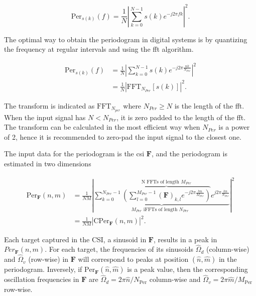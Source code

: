     \begin{equation}
        \text{Per}_{s(k)}(f) = \frac{1}{N}\left| \sum_{k=0}^{N-1} s(k)e^{-j2\pi fk}\right|^2.
    \end{equation}

    The optimal way to obtain the periodogram in digital systems is by quantizing the frequency at regular intervals and using the \gls{fft} algorithm.

    \begin{align}
        \text{Per}_{s(k)}(f) &= \frac{1}{N}\left| \sum_{k=0}^{N-1} s(k)e^{-j2\pi \frac{nk}{N_{Per}}}\right|^2 \\
        &= \frac{1}{N}\left| \text{FFT}_{N_{Per}}[s(k)]\right|^2.
    \end{align}
    
    
    The transform is indicated as $\text{FFT}_{N_{per}}$ where $N_{Per} \geq N$ is the length of the \gls{fft}. When the input signal has $N < N_{Per}$, it is zero padded to the length of the \gls{fft}.
    The transform can be calculated in the most efficient way when $N_{Per}$ is a power of 2, hence it is recommended to zero-pad the input signal to the closest one.

    The input data for the periodogram is the \gls{csi} $\mathbf F$, and the periodogram is estimated in two dimensions

    \begin{equation}
    	\label{eq:periodogram_full}
    	\begin{aligned}
    		\text{Per}_{\mathbf F}(n,m) &= \frac{1}{NM} \left| \underbrace{ \sum_{k=0}^{N_{Per}-1}  \overbrace{\left(  \sum_{l=0}^{M_{Per}-1} (\mathbf F)_{k,l} e^{-j2\pi \frac{lm}{M_{Per}}} \right)}^{\text{N FFTs of length $M_{Per}$}}  e^{j2\pi\frac{kn}{N_{Per}}}}_{ \text{$M_{Per}$ iFFTs of length $N_{Per}$ }} \right| ^ 2 \\
    		&= \frac{1}{NM} \left| \text{CPer}_{\mathbf F}(n,m) \right| ^ 2.
    	\end{aligned}
    \end{equation}


    Each target captured in the CSI, \ie a sinusoid in $\mathbf F$, results in a peak in $Per_{\mathbf F}(n,m)$.
    For each target, the frequencies of its sinusoids $\hat{\Omega}_d$ (column-wise) and $\hat{\Omega}_v$ (row-wise) in $\mathbf F$ will correspond to peaks at position $(\hat{n}, \hat{m})$ in the periodogram. Inversely, if $\text{Per}_{\bm{F}}(\hat{n},\hat{m})$ is a peak value, then the corresponding oscillation frequencies in $\mathbf F$ are $\hat{\Omega}_d = 2\pi\hat{n}/N_{\text{Per}}$ column-wise and $\hat{\Omega}_v = 2\pi\hat{m}/M_{\text{Per}}$ row-wise.
    

